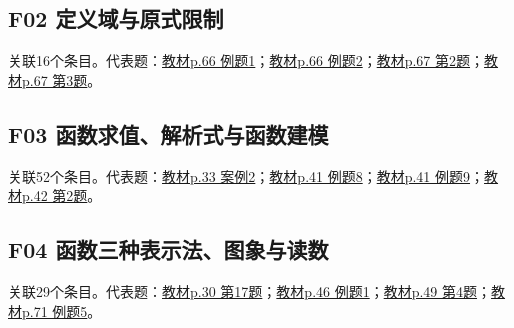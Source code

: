 \par\medskip\noindent\begin{minipage}{\linewidth}\subsection{F02 定义域与原式限制}关联16个条目。代表题：\hyperref[XJ-B1-C03-EX-P066-Y0934]{教材p.66 例题1}；\hyperref[XJ-B1-C03-EX-P066-Y1436]{教材p.66 例题2}；\hyperref[XJ-B1-C03-PR-P067-Y1075]{教材p.67 第2题}；\hyperref[XJ-B1-C03-PR-P067-Y1287]{教材p.67 第3题}。\end{minipage}\par
\par\medskip\noindent\begin{minipage}{\linewidth}\subsection{F03 函数求值、解析式与函数建模}关联52个条目。代表题：\hyperref[XJ-B1-C02-CA-P033-Y0951]{教材p.33 案例2}；\hyperref[XJ-B1-C02-EX-P041-Y0698]{教材p.41 例题8}；\hyperref[XJ-B1-C02-EX-P041-Y1378]{教材p.41 例题9}；\hyperref[XJ-B1-C02-PR-P042-Y1011]{教材p.42 第2题}。\end{minipage}\par
\par\medskip\noindent\begin{minipage}{\linewidth}\subsection{F04 函数三种表示法、图象与读数}关联29个条目。代表题：\hyperref[XJ-B1-C01-RV-P030-Y1286]{教材p.30 第17题}；\hyperref[XJ-B1-C02-EX-P046-Y1243]{教材p.46 例题1}；\hyperref[XJ-B1-C02-HW-P049-Y0793]{教材p.49 第4题}；\hyperref[XJ-B1-C03-EX-P071-Y1368]{教材p.71 例题5}。\end{minipage}\par
